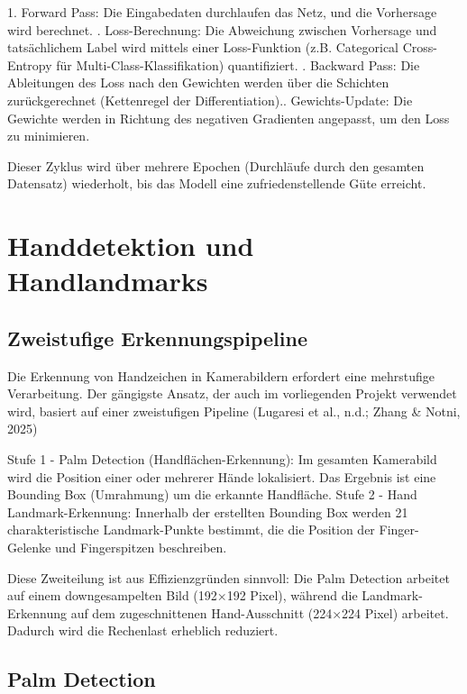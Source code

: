 1. Forward Pass: Die Eingabedaten durchlaufen das Netz, und die Vorhersage wird berechnet. . Loss-Berechnung: Die Abweichung zwischen Vorhersage und tatsächlichem Label wird mittels einer Loss-Funktion (z.B. Categorical Cross-Entropy für Multi-Class-Klassifikation) quantifiziert. . Backward Pass: Die Ableitungen des Loss nach den Gewichten werden über die Schichten zurückgerechnet (Kettenregel der Differentiation).. Gewichts-Update: Die Gewichte werden in Richtung des negativen Gradienten angepasst, um den Loss zu minimieren.

Dieser Zyklus wird über mehrere Epochen (Durchläufe durch den gesamten Datensatz) wiederholt, bis das Modell eine zufriedenstellende Güte erreicht.

\section{Handdetektion und Handlandmarks}

\subsection{Zweistufige Erkennungspipeline}

Die Erkennung von Handzeichen in Kamerabildern erfordert eine mehrstufige Verarbeitung. Der gängigste Ansatz, der auch im vorliegenden Projekt verwendet wird, basiert auf einer zweistufigen Pipeline (Lugaresi et al., n.d.; Zhang \& Notni, 2025)

Stufe 1 - Palm Detection (Handflächen-Erkennung): Im gesamten Kamerabild wird die Position einer oder mehrerer Hände lokalisiert. Das Ergebnis ist eine Bounding Box (Umrahmung) um die erkannte Handfläche.
Stufe 2 - Hand Landmark-Erkennung: Innerhalb der erstellten Bounding Box werden 21 charakteristische Landmark-Punkte bestimmt, die die Position der Finger-Gelenke und Fingerspitzen beschreiben.

Diese Zweiteilung ist aus Effizienzgründen sinnvoll: Die Palm Detection arbeitet auf einem downgesampelten Bild (192×192 Pixel), während die Landmark-Erkennung auf dem zugeschnittenen Hand-Ausschnitt (224×224 Pixel) arbeitet. Dadurch wird die Rechenlast erheblich reduziert.

\subsection{Palm Detection}

